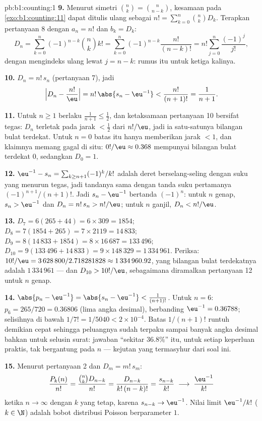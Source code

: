 \begin{solution}{pb:b1:counting:1}
\textbf{9.} Menurut simetri $\binom nk = \binom n{n-k}$, kesamaan
pada \cref{exo:b1:counting:11} dapat ditulis ulang sebagai $n! =
\sum_{k=0}^n \binom nk D_k$. Terapkan pertanyaan 8 dengan $a_n = n!$ dan
$b_k = D_k$:
\[
D_n = \sum_{k=0}^{n} (-1)^{n-k} \binom nk k!
= \sum_{k=0}^{n} (-1)^{n-k} \frac{n!}{(n-k)!}
= n! \sum_{j=0}^{n} \frac{(-1)^j}{j!} ,
\]
dengan mengindeks ulang lewat $j = n - k$: rumus itu untuk ketiga kalinya.

\textbf{10.} $D_n = n!\,s_n$ (pertanyaan 7), jadi
\[
\Bigl| D_n - \frac{n!}{\eu} \Bigr|
= n!\,\abs{s_n - \eu^{-1}} < \frac{n!}{(n+1)!} = \frac1{n+1} .
\]

\textbf{11.} Untuk $n \geq 1$ berlaku $\frac1{n+1} \leq \frac12$, dan
ketaksamaan pertanyaan 10 bersifat tegas: $D_n$ terletak pada jarak
$< \frac12$ dari $n!/\eu$, jadi ia satu-satunya bilangan bulat terdekat. Untuk
$n = 0$ batas itu hanya memberikan jarak $< 1$, dan klaimnya memang
gagal di situ: $0!/\eu \approx 0.368$ mempunyai bilangan bulat terdekat $0$, sedangkan
$D_0 = 1$.

\textbf{12.} $\eu^{-1} - s_n = \sum_{k \geq n+1} (-1)^k/k!$ adalah
deret berselang-seling dengan suku yang menurun tegas, jadi tandanya sama dengan
tanda suku pertamanya $(-1)^{n+1}/(n+1)!$. Jadi $s_n -
\eu^{-1}$ bertanda $(-1)^n$: untuk $n$ genap, $s_n > \eu^{-1}$
dan $D_n = n!\,s_n > n!/\eu$; untuk $n$ ganjil, $D_n < n!/\eu$.

\textbf{13.} $D_7 = 6(265 + 44) = 6 \times 309 = 1854$; $D_8 =
7(1854 + 265) = 7 \times 2119 = 14\,833$; $D_9 = 8(14\,833 + 1854)
= 8 \times 16\,687 = 133\,496$; $D_{10} = 9(133\,496 + 14\,833) =
9 \times 148\,329 = 1\,334\,961$. Periksa: $10!/\eu = 3\,628\,800 /
2.718281828 \approx 1\,334\,960.92$, yang bilangan bulat terdekatnya adalah
$1\,334\,961$ --- dan $D_{10} > 10!/\eu$, sebagaimana diramalkan pertanyaan 12
untuk $n$ genap.

\textbf{14.} $\abs{p_n - \eu^{-1}} = \abs{s_n - \eu^{-1}} <
\frac1{(n+1)!}$. Untuk $n = 6$: $p_6 = 265/720 = 0.36806$ (lima
angka desimal), berbanding $\eu^{-1} = 0.36788$; selisihnya di bawah $1/7! =
1/5040 < 2 \times 10^{-4}$. Batas $1/(n+1)!$ runtuh demikian cepat
sehingga peluangnya sudah terpaku sampai banyak angka desimal bahkan untuk
selusin surat: jawaban ``sekitar $36.8\%$'' itu, untuk setiap
keperluan praktis, tak bergantung pada $n$ --- kejutan yang termasyhur
dari soal ini.

\textbf{15.} Menurut pertanyaan 2 dan $D_m = m!\,s_m$:
\[
\frac{P_k(n)}{n!} = \frac{\binom nk D_{n-k}}{n!}
= \frac{D_{n-k}}{k!\,(n-k)!} = \frac{s_{n-k}}{k!}
\;\longrightarrow\; \frac{\eu^{-1}}{k!}
\]
ketika $n \to \infty$ dengan $k$ yang tetap, karena $s_{n-k} \to \eu^{-1}$.
Nilai limit $\eu^{-1}/k!$ ($k \in \N$) adalah bobot
distribusi Poisson berparameter $1$.


\end{solution}
